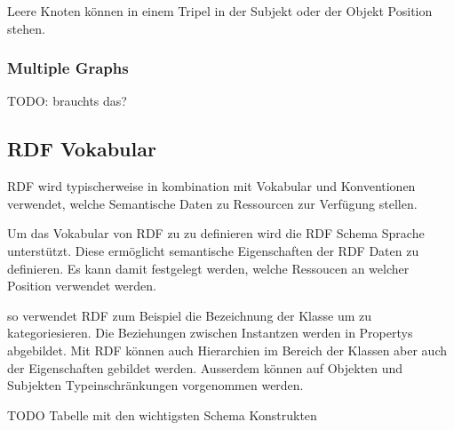 \noindent\hspace*{15mm} Leere Knoten können in einem Tripel in der Subjekt oder der Objekt Position stehen.


\subsubsection{Multiple Graphs}
\label{sec:owlRdf_rdf_dataModel_multipleGraphs}

TODO: brauchts das?

\subsection{RDF Vokabular}
\label{sec:owlRdf_rdf_voca}
RDF wird typischerweise in kombination mit Vokabular und Konventionen verwendet, welche Semantische Daten zu Ressourcen zur Verfügung stellen.

Um das Vokabular von RDF zu zu definieren wird die RDF Schema Sprache unterstützt. Diese ermöglicht semantische Eigenschaften der RDF Daten zu definieren. Es kann damit festgelegt werden, welche Ressoucen an welcher Position verwendet werden.

so verwendet RDF zum Beispiel die Bezeichnung der Klasse um zu kategoriesieren. Die Beziehungen zwischen Instantzen werden in Propertys abgebildet. Mit RDF können auch Hierarchien im Bereich der Klassen aber auch der Eigenschaften gebildet werden. Ausserdem können auf Objekten und Subjekten Typeinschränkungen vorgenommen werden.

TODO Tabelle mit den wichtigsten Schema Konstrukten




